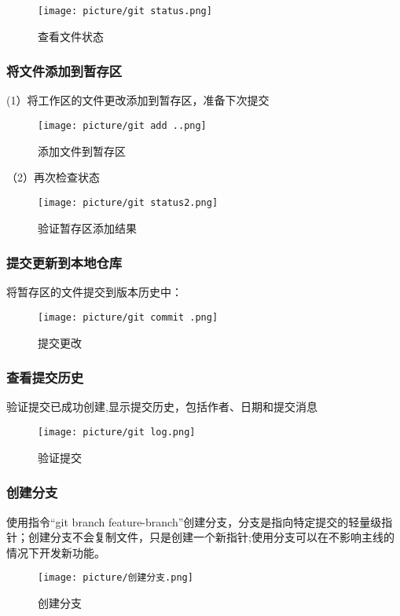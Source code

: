 \documentclass[UTF8]{ctexart}
\begin{document}
\begin{figure}[H]
    \centering
    \texttt{[image: picture/git status.png]}
    \caption{查看文件状态}
\end{figure}

\subsubsection{将文件添加到暂存区}
(1）将工作区的文件更改添加到暂存区，准备下次提交
\begin{figure}[H]
    \centering
    \texttt{[image: picture/git add ..png]}
    \caption{添加文件到暂存区}
\end{figure}
（2）再次检查状态
\begin{figure}[H]
    \centering
    \texttt{[image: picture/git status2.png]}
    \caption{验证暂存区添加结果}
\end{figure}

\subsubsection{提交更新到本地仓库}
将暂存区的文件提交到版本历史中：
\begin{figure}[H]
    \centering
    \texttt{[image: picture/git commit .png]}%
    \caption{提交更改}
\end{figure}

\subsubsection{查看提交历史}
验证提交已成功创建,显示提交历史，包括作者、日期和提交消息
\begin{figure}[H]
    \centering
    \texttt{[image: picture/git log.png]}%
    \caption{验证提交}
\end{figure}

\subsubsection{创建分支}
使用指令“git branch feature-branch”创建分支，分支是指向特定提交的轻量级指针；创建分支不会复制文件，只是创建一个新指针;使用分支可以在不影响主线的情况下开发新功能。
\begin{figure}[H]
    \centering
    \texttt{[image: picture/创建分支.png]}%
    \caption{创建分支}
\end{figure}
\end{document}
